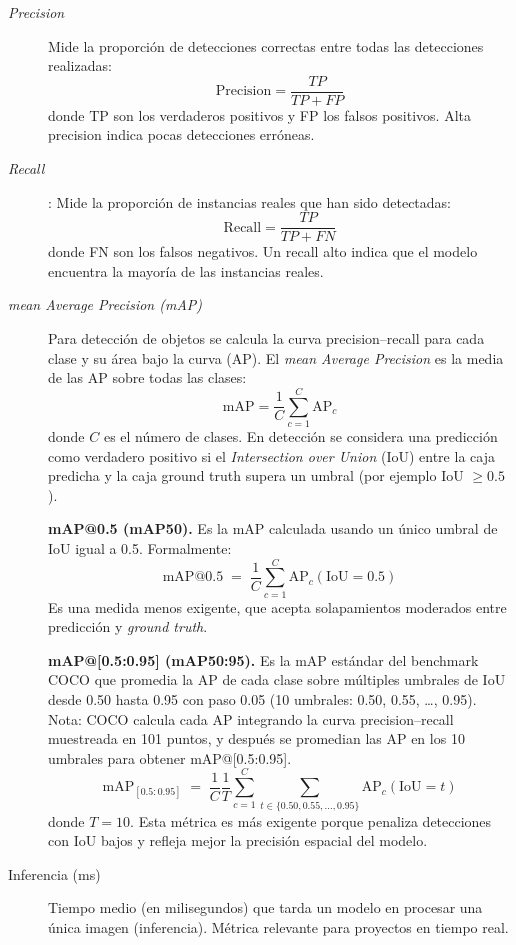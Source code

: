 \documentclass[12pt,a4paper,onecolumn,oneside]{report}
\begin{document}
\begin{description}
  \item[\textit{Precision}] Mide la proporción de detecciones correctas entre todas las detecciones realizadas:
  \[
    \mathrm{Precision} = \frac{TP}{TP + FP}
  \]
  donde TP son los verdaderos positivos y FP los falsos positivos. Alta precision indica pocas detecciones erróneas.

  \item[\textit{Recall}]: Mide la proporción de instancias reales que han sido detectadas:
  \[
    \mathrm{Recall} = \frac{TP}{TP + FN}
  \]
  donde FN son los falsos negativos. Un recall alto indica que el modelo encuentra la mayoría de las instancias reales.

  \item[\textit{mean Average Precision (mAP)}] Para detección de objetos se calcula la curva precision–recall para cada clase y su área bajo la curva (AP). El \textit{mean Average Precision} es la media de las AP sobre todas las clases:
  \[
    \mathrm{mAP} = \frac{1}{C}\sum_{c=1}^{C} \mathrm{AP}_c
  \]
  donde $C$ es el número de clases. En detección se considera una predicción como verdadero positivo si el \textit{Intersection over Union} (IoU) entre la caja predicha y la caja ground truth supera un umbral (por ejemplo IoU $\geq 0.5$). 

  \medskip

  \noindent\textbf{mAP@0.5 (mAP50).} Es la mAP calculada usando un único umbral de IoU igual a 0.5. Formalmente:
  \[
    \mathrm{mAP@0.5} \;=\; \frac{1}{C}\sum_{c=1}^{C} \mathrm{AP}_c(\mathrm{IoU}=0.5)
  \]
  Es una medida menos exigente, que acepta solapamientos moderados entre predicción y \textit{ground truth}.

  \medskip

  \noindent\textbf{mAP@[0.5:0.95] (mAP50:95).} Es la mAP estándar del benchmark COCO que promedia la AP de cada clase sobre múltiples umbrales de IoU desde 0.50 hasta 0.95 con paso 0.05 (10 umbrales: 0.50, 0.55, …, 0.95). Nota: COCO calcula cada AP integrando la curva precision–recall muestreada en 101 puntos, y después se promedian las AP en los 10 umbrales para obtener mAP@[0.5:0.95].
  \[
    \mathrm{mAP}_{[0.5:0.95]} \;=\; \frac{1}{C}\frac{1}{T}\sum_{c=1}^{C}\sum_{t\in\{0.50,0.55,\dots,0.95\}} \mathrm{AP}_c(\mathrm{IoU}=t)
  \]
  donde $T=10$. Esta métrica es más exigente porque penaliza detecciones con IoU bajos y refleja mejor la precisión espacial del modelo.
  \item[Inferencia (ms)] Tiempo medio (en milisegundos) que tarda un modelo en procesar una única imagen (inferencia). Métrica relevante para proyectos en tiempo real.
\end{description}
\end{document}
